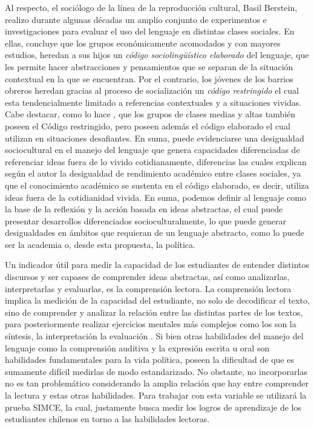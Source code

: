\documentclass[12pt,twoside]{templates/facsothesis}
\begin{document}
Al respecto, el sociólogo de la línea de la reproducción cultural, Basil Berstein, realizo durante algunas décadas un amplio conjunto de experimentos e investigaciones para evaluar el uso del lenguaje en distintas clases sociales. En ellas, \citet{bernstein_CLASES_1985} concluye que los grupos económicamente acomodados y con mayores estudios, heredan a sus hijos un \emph{código sociolingüístico elaborado} del lenguaje, que les permite hacer abstracciones y pensamientos que se separan de la situación contextual en la que se encuentran. Por el contrario, los jóvenes de los barrios obreros heredan gracias al proceso de socialización un \emph{código restringido} el cual esta tendencialmente limitado a referencias contextuales y a situaciones vividas. Cabe destacar, como lo hace \citet{bernstein_Poder_1988}, que los grupos de clases medias y altas también poseen el Código restringido, pero poseen además el código elaborado el cual utilizan en situaciones desafiantes. En suma, puede evidenciarse una desigualdad sociocultural en el manejo del lenguaje que genera capacidades diferenciadas de referenciar ideas fuera de lo vivido cotidianamente, diferencias las cuales explican según el autor la desigualdad de rendimiento académico entre clases sociales, ya que el conocimiento académico se sustenta en el código elaborado, es decir, utiliza ideas fuera de la cotidianidad vivida. En suma, podemos definir al lenguaje como la base de la reflexión y la acción basada en ideas abstractas, el cual puede presentar desarrollos diferenciados socioculturalmente, lo que puede generar desigualdades en ámbitos que requieran de un lenguaje abstracto, como lo puede ser la academia o, desde esta propuesta, la política.

Un indicador útil para medir la capacidad de los estudiantes de entender distintos discursos y ser capases de comprender ideas abstractas, así como analizarlas, interpretarlas y evaluarlas, es la comprensión lectora. La comprensión lectora implica la medición de la capacidad del estudiante, no solo de decodificar el texto, sino de comprender y analizar la relación entre las distintas partes de los textos, para posteriormente realizar ejercicios mentales más complejos como los son la síntesis, la interpretación la evaluación \citep{ace_Informe_2018}. Si bien otras habilidades del manejo del lenguaje como la comprensión auditiva y la expresión escrita u oral son habilidades fundamentales para la vida política, poseen la dificultad de que es sumamente difícil medirlas de modo estandarizado. No obstante, no incorporarlas no es tan problemático considerando la amplia relación que hay entre comprender la lectura y estas otras habilidades. Para trabajar con esta variable se utilizará la prueba SIMCE, la cual, justamente busca medir los logros de aprendizaje de los estudiantes chilenos en torno a las habilidades lectoras.
\end{document}
